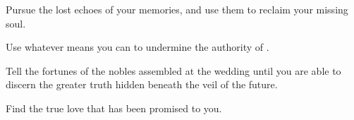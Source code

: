 \documentclass[char]{Kos}
\begin{document}
\begin{itemz}[Goals]
\item Pursue the lost echoes of your memories, and use them to reclaim your missing soul.
\item Use whatever means you can to undermine the authority of \cEtruriaKing{\Monarch} \cEtruriaKing{}.
\item Tell the fortunes of the nobles assembled at the wedding until you are able to discern the greater truth hidden beneath the veil of the future.
\item Find the true love that has been promised to you.
\end{itemz}
\end{document}

